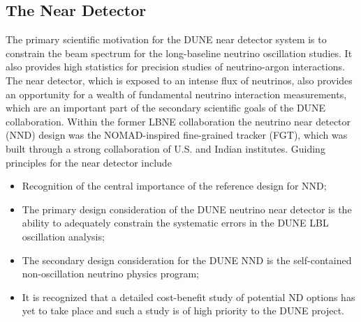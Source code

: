 \subsection{The Near Detector}
\label{sec:intro-dune-near-det}


The primary scientific motivation for the DUNE near detector system is to constrain the beam spectrum for the long-baseline neutrino oscillation studies. It also provides high statistics for precision studies of neutrino-argon interactions. The near detector, which is exposed to an intense flux of neutrinos, also provides an opportunity for a wealth of fundamental neutrino interaction measurements, which are an important part of the secondary scientific goals of the DUNE collaboration. Within the former LBNE collaboration the neutrino near detector (NND) design was the NOMAD-inspired fine-grained tracker (FGT), which was built through a strong collaboration of U.S. and Indian institutes. Guiding principles for the near detector include

\begin{itemize}
\item Recognition of the central importance of the reference design for NND;

\item The primary design consideration of the DUNE neutrino near detector is the ability to adequately constrain the systematic errors in the DUNE LBL oscillation analysis;

\item The secondary design consideration for the DUNE NND is the self-contained non-oscillation neutrino physics program;

\item It is recognized that a detailed cost-benefit study of potential ND options has yet to take place and such a study is of high priority to the DUNE project. 
\end{itemize}

